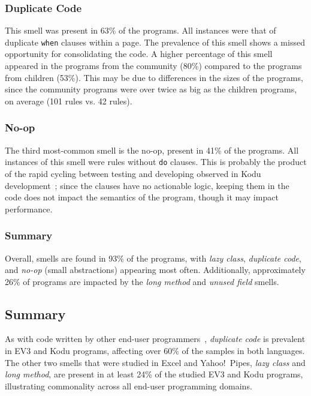 \documentclass[conference]{IEEEtran}
\begin{document}
\subsubsection{Duplicate Code}
This smell was present in 63\% of the programs. All instances were that of duplicate {\tt when} clauses within a page. The prevalence of this smell shows a missed opportunity for consolidating the code. A higher percentage of this smell appeared in the programs from the community (80\%) compared to the programs from children (53\%). This may be due to differences in the sizes of the programs, since the community programs were over twice as big as the children programs, on average (101 rules vs. 42 rules). 

\subsubsection{No-op}
The third most-common smell is the no-op, present in 41\% of the programs. All instances of this smell were rules without {\tt do} clauses.  This is probably the product of the rapid cycling between testing and developing observed in Kodu development~\cite{Stolee:2011:ECS:1953163.1953197}; since the clauses have no actionable logic, keeping them in the code does not impact the semantics of the program, though it may impact performance. 

\subsubsection{Summary}
Overall, smells are found in 93\% of the programs, with \emph{lazy class}, \emph{duplicate code},  and \emph{no-op} (small abstractions) appearing most often. Additionally, approximately 26\% of programs are impacted by the \emph{long method} and \emph{unused field} smells. 

\subsection{Summary}


As with code written by other end-user programmers~\cite{StoleeTSE2013}, \emph{duplicate code} is prevalent in EV3 and Kodu programs, affecting over 60\% of the samples in both languages. The other two smells that were studied in Excel and Yahoo!\ Pipes, \emph{lazy class} and \emph{long method}, are present in at least 24\% of the studied EV3 and Kodu programs, illustrating commonality across all end-user programming domains. 
\end{document}
